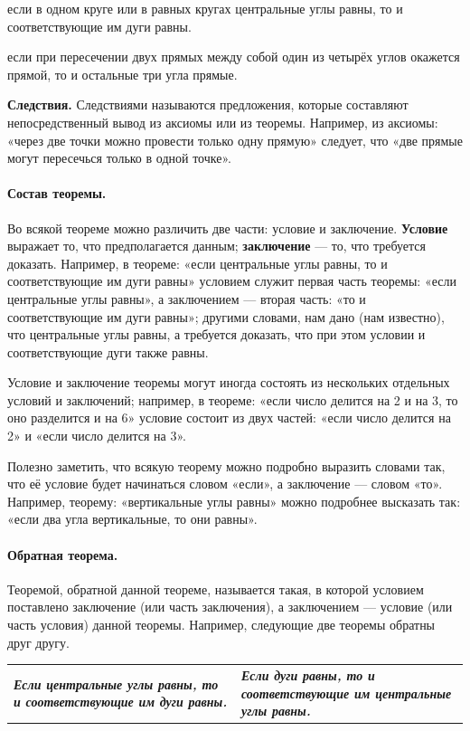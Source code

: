 \documentclass[oneside]{book}
\begin{document}
если в одном круге или в равных кругах центральные углы равны, то и соответствующие им дуги равны.

если при пересечении двух прямых между собой один из четырёх углов окажется прямой, то и остальные три угла прямые.

\textbf{Следствия.}
Следствиями называются предложения, которые составляют непосредственный вывод из аксиомы или из теоремы.
Например, из аксиомы:
«через две точки можно провести только одну прямую» следует, что «две прямые могут пересечься только в одной точке».

\paragraph{Состав теоремы.}\label{1938/29}
Во всякой теореме можно различить две части:
условие и заключение.
\textbf{Условие} выражает то, что предполагается данным;
\textbf{заключение} — то, что требуется доказать.
Например, в теореме:
«если центральные углы равны, то и соответствующие им дуги равны» условием служит первая часть теоремы:
«если центральные углы равны», а заключением — вторая часть:
«то и соответствующие им дуги равны»;
другими словами, нам дано (нам известно), что центральные углы равны, а требуется доказать, что при этом условии и соответствующие дуги также равны.

Условие и заключение теоремы могут иногда состоять из нескольких отдельных условий и заключений;
например, в теореме:
«если число делится на 2 и на 3, то оно разделится и на 6» условие состоит из двух частей:
«если число делится на 2» и «если число делится на 3».

Полезно заметить, что всякую теорему можно подробно выразить словами так, что её условие будет начинаться словом «если», а заключение — словом «то».
Например, теорему:
«вертикальные углы равны» можно подробнее высказать так:
«если два угла вертикальные, то они равны».

\paragraph{Обратная теорема.}\label{1938/30}
Теоремой, обратной данной теореме, называется такая, в которой условием поставлено заключение (или часть заключения), а заключением — условие (или часть условия) данной теоремы.
Например, следующие две теоремы обратны друг другу.

\medskip

\noindent
\begin{tabular}{ p{}| p{} }
\textbf{\emph{Если центральные углы равны, то и соответствующие им дуги равны.}}
&
\textbf{\emph{Если дуги равны, то и соответствующие им центральные углы равны.}}
\end{tabular}
\end{document}
